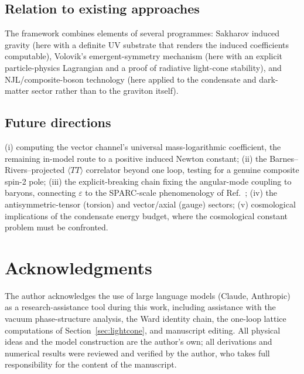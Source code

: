 \documentclass[11pt,a4paper]{article}
\begin{document}
\subsection{Relation to existing approaches}

The framework combines elements of several programmes:
Sakharov induced gravity \cite{Sakharov:1967pk} (here with a
definite UV substrate that renders the induced coefficients
computable), Volovik's emergent-symmetry mechanism
\cite{Volovik:2003fe} (here with an explicit particle-physics
Lagrangian and a proof of radiative light-cone stability), and
NJL/composite-boson technology
\cite{Nambu:1961tp,Akama:1978pg,Zee:1981,Amati:1982bp}
(here applied to the condensate and dark-matter sector rather than
to the graviton itself).

\subsection{Future directions}

(i) computing the vector channel's universal mass-logarithmic
coefficient, the remaining in-model route to a positive induced
Newton constant;
(ii) the Barnes--Rivers--projected $\langle TT\rangle$ correlator
beyond one loop, testing for a genuine composite spin-2 pole;
(iii) the explicit-breaking chain fixing the angular-mode coupling
to baryons, connecting $\varepsilon$ to the SPARC-scale
phenomenology of Ref.~\cite{Cheng:2025sparc};
(iv) the antisymmetric-tensor (torsion) and vector/axial (gauge)
sectors;
(v) cosmological implications of the condensate energy budget,
where the cosmological constant problem must be confronted.


\section*{Acknowledgments}

The author acknowledges the use of large language models
(Claude, Anthropic) as a research-assistance tool during this work,
including assistance with the vacuum phase-structure analysis, the
Ward identity chain, the one-loop lattice computations of
Section~\ref{sec:lightcone}, and manuscript editing.
All physical ideas and the model construction are the author's own;
all derivations and numerical results were reviewed and verified by
the author, who takes full responsibility for the content of the
manuscript.
\end{document}
